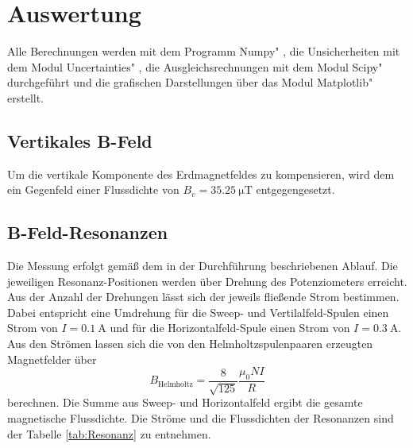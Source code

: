 \section{Auswertung}
\label{sec:Auswertung}
Alle Berechnungen werden mit dem Programm \glqq Numpy" \cite{numpy}, die Unsicherheiten mit dem Modul \glqq Uncertainties" \cite{uncertainties}, die Ausgleichsrechnungen mit dem Modul \glqq Scipy" \cite{scipy} durchgeführt und die grafischen Darstellungen über das Modul \glqq Matplotlib" \cite{matplotlib} erstellt.



\subsection{Vertikales B-Feld}

Um die vertikale Komponente des Erdmagnetfeldes zu kompensieren, wird dem ein Gegenfeld einer Flussdichte von $B_v=\SI{35.25}{\micro\tesla}$ entgegengesetzt.


\subsection{B-Feld-Resonanzen}
Die Messung erfolgt gemäß dem in der Durchführung beschriebenen Ablauf. Die jeweiligen Resonanz-Positionen werden über Drehung des Potenziometers erreicht. 
Aus der Anzahl der Drehungen lässt sich der jeweils fließende Strom bestimmen. 
Dabei entspricht eine Umdrehung für die Sweep- und Vertilalfeld-Spulen einen Strom von $I=\SI{0.1}{\ampere}$ und für die Horizontalfeld-Spule einen Strom von $I=\SI{0.3}{\ampere}$. 
Aus den Strömen lassen sich die von den Helmholtzspulenpaaren erzeugten Magnetfelder über
\begin{equation}
    B_{\text{Helmholtz}} = \frac{8}{\sqrt{125}}\frac{\mu_0 N I}{R}
\end{equation}
berechnen. Die Summe aus Sweep- und Horizontalfeld ergibt die gesamte magnetische Flussdichte.
Die Ströme und die Flussdichten der Resonanzen sind der Tabelle \ref{tab:Resonanz} zu entnehmen. 

